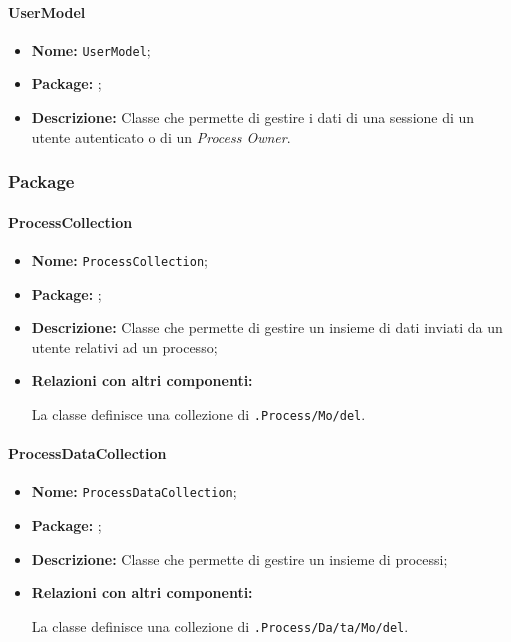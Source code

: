 \paragraph{UserModel}
\begin{flushleft}
\begin{itemize}
\item \textbf{Nome:} \texttt{UserModel};
\item \textbf{Package:} \texttt{\model{}};
\item \textbf{Descrizione:} Classe che permette di gestire i dati di una sessione di un utente autenticato o di un \textit{Process Owner}.
\end{itemize}
\end{flushleft}

\subsubsection{Package \collection{}}

\paragraph{ProcessCollection}
\begin{flushleft}
\begin{itemize}
\item \textbf{Nome:} \texttt{ProcessCollection};
\item \textbf{Package:} \texttt{\collection{}};
\item \textbf{Descrizione:} Classe che permette di gestire un insieme di dati inviati da un utente relativi ad un processo;
\item \textbf{Relazioni con altri componenti:}
\begin{sloppypar}
La classe definisce una collezione di \texttt{\model{}.Process\fshyp{}Mo\fshyp{}del}.
\end{sloppypar}
\end{itemize}
\end{flushleft}

\paragraph{ProcessDataCollection}
\begin{flushleft}
\begin{itemize}
\item \textbf{Nome:} \texttt{ProcessDataCollection};
\item \textbf{Package:} \texttt{\collection{}};
\item \textbf{Descrizione:} Classe che permette di gestire un insieme di processi;
\item \textbf{Relazioni con altri componenti:}
\begin{sloppypar}
La classe definisce una collezione di \texttt{\model{}.Process\fshyp{}Da\fshyp{}ta\fshyp{}Mo\fshyp{}del}.
\end{sloppypar}
\end{itemize}
\end{flushleft}

